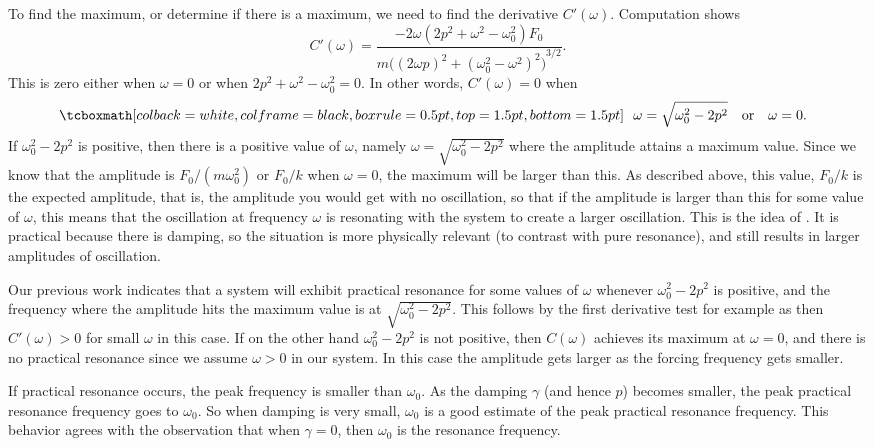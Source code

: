 To find the maximum, or determine if there is a maximum, we need to find the derivative $C'(\omega)$.
Computation shows
\begin{equation*}
C'(\omega) =
\frac{- 2\omega( 2p^2+\omega^2-\omega_0^2)F_0}
{m {\bigl({(2\omega p)}^2+{(\omega_0^2-\omega^2)}^2\bigr)}^{3/2}} .
\end{equation*}
This is zero either when $\omega = 0$ or when
$2p^2+\omega^2-\omega_0^2 = 0$.  In other words, $C'(\omega) = 0$ when
\begin{equation*}
\mybxbg{
~~
\omega = \sqrt{\omega_0^2 - 2p^2} \quad \text{or} \quad \omega = 0 .
~~
}
\end{equation*}
If $\omega_0^2 - 2p^2$ is positive, then there is a positive value of $\omega$, namely
$\omega = \sqrt{\omega_0^2 - 2p^2}$ where the amplitude attains a maximum value. Since we know that the amplitude is $F_0/(m\omega_0^2)$ or $F_0/k$ when $\omega = 0$, the maximum will be larger than this. As described above, this value, $F_0/k$ is the expected amplitude, that is, the amplitude you would get with no oscillation, so that if the amplitude is larger than this for some value of $\omega$, this means that the oscillation at frequency $\omega$ is resonating with the system to create a larger oscillation. This is the idea of \emph{}. It is practical because there is damping, so the situation is more physically relevant (to contrast with pure resonance), and still results in larger amplitudes of oscillation. 

Our previous work indicates that a system will exhibit practical resonance for some values of $\omega$ whenever $\omega_0^2 - 2p^2$ is positive, and the frequency where the amplitude hits the maximum value is at $\sqrt{\omega_0^2 - 2p^2}$. This follows by the first derivative
test for example as then $C'(\omega) > 0$ for small $\omega$ in this case.
If on the other hand $\omega_0^2 - 2p^2$ is not positive, then
$C(\omega)$ achieves its maximum at
$\omega=0$, and
there is no practical resonance since we assume $\omega > 0$
in our system.  In this case the amplitude gets larger as the forcing
frequency gets smaller.

If practical resonance occurs, the peak frequency is smaller than
$\omega_0$.  As the damping $\gamma$ (and hence $p$) becomes smaller, the
peak practical resonance frequency
goes to $\omega_0$.  So when damping is very
small, $\omega_0$ is a good estimate of the peak practical resonance frequency.  This
behavior
agrees with the observation that when $\gamma=0$, then $\omega_0$ is the resonance
frequency.

